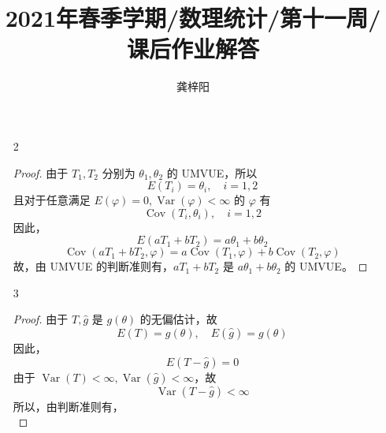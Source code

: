 \documentclass[normal,founder,mtpro2,cn]{elegantnote}
\title{2021年春季学期/数理统计/第十一周/课后作业解答}
\author{龚梓阳}
\date{\zhtoday}
\begin{document}
\maketitle
\begin{enumerate}
    \item[2]
        \begin{proof}
            由于 $T_{1},T_{2}$ 分别为 $\theta_{1},\theta_{2}$ 的 UMVUE，所以
            \begin{equation*}
                E\left(T_{i}\right)=\theta_{i},\quad i=1,2
            \end{equation*}
            且对于任意满足 $E\left(\varphi\right)=0,\operatorname{Var}\left(\varphi\right)<\infty$ 的 $\varphi$ 有
            \begin{equation*}
                \operatorname{Cov}\left(T_{i},\theta_{i}\right),\quad i=1,2
            \end{equation*}
            因此，
            \begin{equation*}
                E\left(aT_{1}+bT_{2}\right)=a\theta_{1}+b\theta_{2}
            \end{equation*}
            \begin{equation*}
                \operatorname{Cov}\left(aT_{1}+bT_{2},\varphi\right)=a\operatorname{Cov}\left(T_{1},\varphi\right)+b\operatorname{Cov}\left(T_{2},\varphi\right)
            \end{equation*}
            故，由 UMVUE 的判断准则有，$aT_{1}+bT_{2}$ 是 $a\theta_{1}+b\theta_{2}$ 的 UMVUE。
        \end{proof}
    \item[3]
        \begin{proof}
            由于 $T,\hat{g}$ 是 $g\left(\theta\right)$ 的无偏估计，故
            \begin{equation*}
                E\left(T\right)=g\left(\theta\right),\quad E\left(\hat{g}\right)=g\left(\theta\right)
            \end{equation*}
            因此，
            \begin{equation*}
                E\left(T-\hat{g}\right)=0
            \end{equation*}
            由于 $\operatorname{Var}\left(T\right)<\infty,\operatorname{Var}\left(\hat{g}\right)<\infty$，故
            \begin{equation*}
                \operatorname{Var}\left(T-\hat{g}\right)<\infty
            \end{equation*}
            所以，由判断准则有，
            \begin{equation*}

\end{equation*}
\end{proof}
\end{enumerate}
\end{document}
